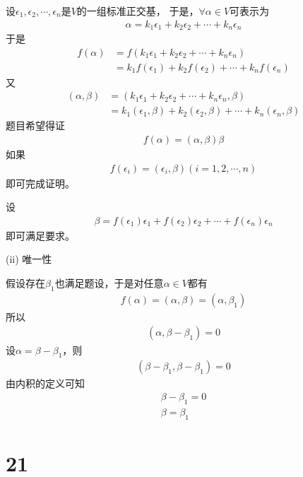 \documentclass{article}
\begin{document}
设$\epsilon_1, \epsilon_2, \cdots, \epsilon_n$是$V$的一组标准正交基，
于是，$\forall \alpha \in V$可表示为
\begin{align*}
  \alpha = k_1 \epsilon_1 + k_2 \epsilon_2 + \cdots + k_n \epsilon_n
\end{align*}
于是
\begin{align*}
  f(\alpha) & = f(k_1 \epsilon_1 + k_2 \epsilon_2 + \cdots + k_n \epsilon_n)       \\
            & = k_1 f(\epsilon_1) + k_2 f(\epsilon_2) + \cdots + k_n f(\epsilon_n)
\end{align*}
又
\begin{align*}
  (\alpha, \beta) & = (k_1 \epsilon_1 + k_2 \epsilon_2 + \cdots + k_n \epsilon_n, \beta)                   \\
                  & = k_1 (\epsilon_1, \beta) + k_2 (\epsilon_2, \beta) + \cdots + k_n (\epsilon_n, \beta)
\end{align*}
题目希望得证
\begin{align*}
  f(\alpha) = (\alpha, \beta) \beta
\end{align*}
如果
\begin{align*}
  f(\epsilon_i) = (\epsilon_i, \beta) (i = 1, 2, \cdots, n)
\end{align*}
即可完成证明。

设
\begin{align*}
  \beta = f(\epsilon_1) \epsilon_1 + f(\epsilon_2) \epsilon_2 + \cdots + f(\epsilon_n) \epsilon_n
\end{align*}
即可满足要求。

(ii) 唯一性

假设存在$\beta_1$也满足题设，于是对任意$\alpha \in V$都有
\begin{align*}
  f(\alpha) = (\alpha, \beta) = (\alpha, \beta_1)
\end{align*}
所以
\begin{align*}
  (\alpha, \beta - \beta_1) = 0
\end{align*}
设$\alpha = \beta - \beta_1$，则
\begin{align*}
  (\beta - \beta_1, \beta - \beta_1) = 0
\end{align*}
由内积的定义可知
\begin{align*}
  \beta - \beta_1 = 0 \\
  \beta = \beta_1
\end{align*}

\section*{21}
\end{document}
